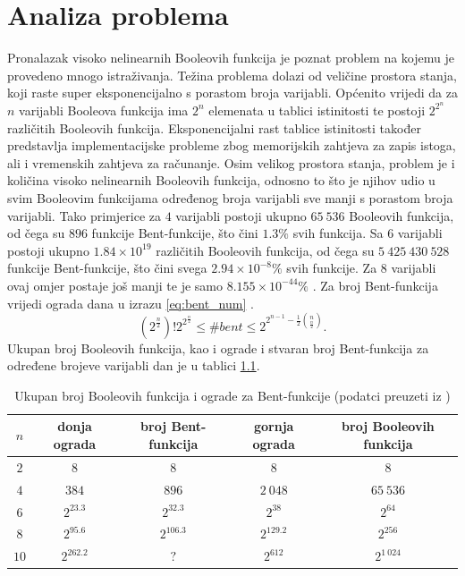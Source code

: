 \chapter{Analiza problema}
Pronalazak visoko nelinearnih Booleovih funkcija je poznat problem na kojemu je provedeno mnogo istraživanja.
Težina problema dolazi od veličine prostora stanja, koji raste super eksponencijalno s porastom broja varijabli.
Općenito vrijedi da za $n$ varijabli Booleova funkcija ima $2^n$ elemenata u tablici istinitosti te postoji $2^{2^n}$ različitih Booleovih funkcija.
Eksponencijalni rast tablice istinitosti također predstavlja implementacijske probleme zbog memorijskih zahtjeva za zapis istoga, ali i vremenskih zahtjeva za računanje.
Osim velikog prostora stanja, problem je i količina visoko nelinearnih Booleovih funkcija, odnosno to što je njihov udio u svim Booleovim funkcijama određenog broja varijabli sve manji s porastom broja varijabli.
Tako primjerice za $4$ varijabli postoji ukupno $65\:536$ Booleovih funkcija, od čega su $896$ funkcije Bent-funkcije, što čini $1.3\%$ svih funkcija.
Sa $6$ varijabli postoji ukupno $1.84 \times 10^{19}$ različitih Booleovih funkcija, od čega su $5\:425\:430\:528$ funkcije Bent-funkcije, što čini svega $2.94 \times 10^{-8}\%$ svih funkcije.
Za $8$ varijabli ovaj omjer postaje još manji te je samo $8.155 \times 10^{-44}\%$ \cite{DiscoveryOfBent}.
Za broj Bent-funkcija vrijedi ograda dana u izrazu \eqref{eq:bent_num} \cite{CryptographicBooleanFunctions}.
\begin{equation}\label{eq:bent_num}
    \left(2^{\frac{n}{2}}\right)! 2^{2^{\frac{n}{2}}} \leq
    \#bent \leq
    2^{2^{n-1}-\frac{1}{2}\binom{n}{\frac{n}{2}}}.
\end{equation}
Ukupan broj Booleovih funkcija, kao i ograde i stvaran broj Bent-funkcija za određene brojeve varijabli dan je u tablici \ref{tbl:boolean_count}.
\begin{table}[]
\begin{tabular}{c|cccc}
$n$ & donja ograda & broj Bent-funkcija & gornja ograda & broj Booleovih funkcija \\ \hline
$2$ & $8$ & $8$ & $8$ & $8$ \\
$4$ & $384$ & $896$ & $2\:048$ & $65\:536$ \\
$6$ & $2^{23.3}$ & $2^{32.3}$ & $2^{38}$ & $2^{64}$ \\
$8$ & $2^{95.6}$ & $2^{106.3}$ & $2^{129.2}$ & $2^{256}$ \\
$10$ & $2^{262.2}$ & $?$ & $2^{612}$ & $2^{1\:024}$
\end{tabular}
\caption{Ukupan broj Booleovih funkcija i ograde za Bent-funkcije (podatci preuzeti iz \cite{CryptographicBooleanFunctions})}
\label{tbl:boolean_count}
\end{table}

